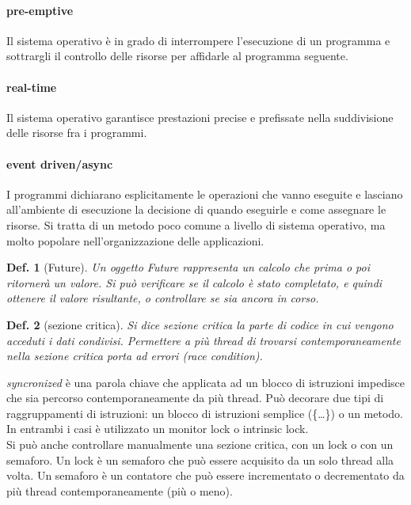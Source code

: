 \documentclass{article}
\newtheorem{definition}{Def.}[section]
\begin{document}
\paragraph{pre-emptive}
Il sistema operativo è in grado di interrompere l'esecuzione di un programma
e sottrargli il controllo delle risorse per affidarle al programma seguente.

\paragraph{real-time}
Il sistema operativo garantisce prestazioni precise e prefissate nella
suddivisione delle risorse fra i programmi.

\paragraph{event driven/async}
I programmi dichiarano esplicitamente le operazioni che vanno eseguite e
lasciano all'ambiente di esecuzione la decisione di quando eseguirle e come
assegnare le risorse. Si tratta di un metodo poco comune a livello di sistema
operativo, ma molto popolare nell'organizzazione delle applicazioni.

\begin{definition}[Future]
	Un oggetto Future rappresenta un calcolo che prima o poi ritornerà un
	valore. Si può verificare se il calcolo è stato completato, e quindi
	ottenere il valore risultante, o controllare se sia ancora in corso.
\end{definition}

\begin{definition}[sezione critica]
	Si dice sezione critica la parte di codice in cui vengono acceduti i dati
	condivisi. Permettere a più thread di trovarsi contemporaneamente nella
	sezione critica porta ad errori (race condition).
\end{definition}

\textit{syncronized} è una parola chiave che applicata ad un blocco di
istruzioni impedisce che sia percorso contemporaneamente da più thread. Può
decorare due tipi di raggruppamenti di istruzioni: un blocco di istruzioni
semplice (\{\dots\}) o un metodo. In entrambi i casi è utilizzato un monitor
lock o intrinsic lock.\\
Si può anche controllare manualmente una sezione critica, con un lock o con un
semaforo. Un lock è un semaforo che può essere acquisito da un solo thread alla
volta. Un semaforo è un contatore che può essere incrementato o decrementato da
più thread contemporaneamente (più o meno).\\
\end{document}
